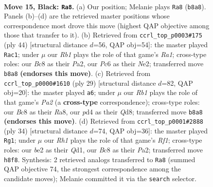 \documentclass[11pt]{article}
\begin{document}
\clearpage

\begin{figure}[p]\centering
\begin{subfigure}{0.46\textwidth}\centering
\resizebox{\linewidth}{!}{%
\newchessgame
\chessboard[
  setfen={1rb1k2r/pp1n2pp/2pq4/3p2p1/3P4/2N1P3/PP2BPPP/2RQR1K1 b k - 5 15},
  showmover=false,
  pgfstyle=straightmove, color=movearrow, markmove={b8-a8}
]}
\caption{}
\end{subfigure}\hfill
\begin{subfigure}{0.46\textwidth}\centering
\resizebox{\linewidth}{!}{%
\newchessgame
\chessboard[
  setfen={2rq3r/pp4k1/2n1pbp1/3p3p/3P4/3QB2P/PP2NPP1/R2R2K1 w - - 4 23},
  showmover=false,
  pgfstyle=straightmove, color=movearrow, markmove={a1-c1}
]}
\caption{}
\end{subfigure}
\\[4pt]
\begin{subfigure}{0.46\textwidth}\centering
\resizebox{\linewidth}{!}{%
\newchessgame
\chessboard[
  setfen={r2qr1k1/pp1n1pbn/3p2pp/2pP4/P1P5/2N2BPP/1P1B1P2/R2Q1RK1 b - - 0 15},
  showmover=false,
  pgfstyle=straightmove, color=movearrow, markmove={a7-a6}
]}
\caption{}
\end{subfigure}\hfill
\begin{subfigure}{0.46\textwidth}\centering
\resizebox{\linewidth}{!}{%
\newchessgame
\chessboard[
  setfen={r2q1r1k/pp1b3p/2n1p3/1N1p1p1P/1b1P4/3BP3/PP3PNP/R2Q1R1K w - - 6 18},
  showmover=false,
  pgfstyle=straightmove, color=movearrow, markmove={f1-g1}
]}
\caption{}
\end{subfigure}
\caption{\textbf{Move 15, Black: \texttt{Ra8}.} (a) Our position; Melanie plays \texttt{Ra8} (\texttt{b8a8}). Panels (b)--(d) are the retrieved master positions whose correspondence most drove this move (highest QAP objective among those that transfer to it). (b) Retrieved from \texttt{ccrl\_top\_p0003\#175} (ply 44) [structural distance $d$=56, QAP obj=54]: the master played \texttt{Rac1}; under $\mu$ our \emph{Rb1} plays the role of that game's \emph{Ra1}; cross-type roles: our \emph{B}c8 as their \emph{P}a2, our \emph{P}c6 as their \emph{N}e2; transferred move \texttt{b8a8} \textbf{(endorses this move)}. (c) Retrieved from \texttt{ccrl\_top\_p0000\#1610} (ply 29) [structural distance $d$=82, QAP obj=20]: the master played \texttt{a6}; under $\mu$ our \emph{Rb1} plays the role of that game's \emph{Pa2} (a \textbf{cross-type} correspondence); cross-type roles: our \emph{B}c8 as their \emph{R}a8, our \emph{p}d4 as their \emph{Q}d8; transferred move \texttt{b8a8} \textbf{(endorses this move)}. (d) Retrieved from \texttt{ccrl\_top\_p0001\#2888} (ply 34) [structural distance $d$=74, QAP obj=36]: the master played \texttt{Rg1}; under $\mu$ our \emph{Rh1} plays the role of that game's \emph{Rf1}; cross-type roles: our \emph{b}e2 as their \emph{Q}d1, our \emph{B}c8 as their \emph{P}a2; transferred move \texttt{h8f8}. Synthesis: 2 retrieved analogs transferred to \texttt{Ra8} (summed QAP objective 74, the strongest correspondence among the candidate moves); Melanie committed it via the \texttt{search} selector.}
\label{fig:thought-m29}
\end{figure}
\end{document}

